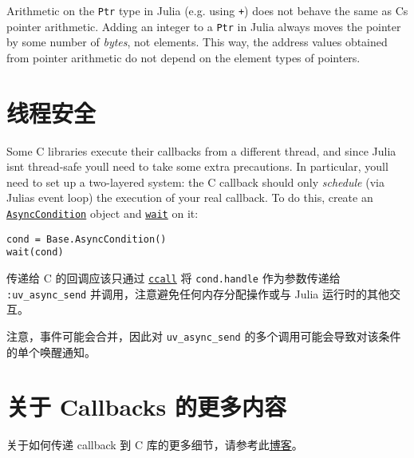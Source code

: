 Arithmetic on the \texttt{Ptr} type in Julia (e.g. using \texttt{+}) does not behave the same as C{\textquotesingle}s pointer arithmetic. Adding an integer to a \texttt{Ptr} in Julia always moves the pointer by some number of \emph{bytes}, not elements. This way, the address values obtained from pointer arithmetic do not depend on the element types of pointers.



\hypertarget{11710684987427742051}{}


\section{线程安全}



Some C libraries execute their callbacks from a different thread, and since Julia isn{\textquotesingle}t thread-safe you{\textquotesingle}ll need to take some extra precautions. In particular, you{\textquotesingle}ll need to set up a two-layered system: the C callback should only \emph{schedule} (via Julia{\textquotesingle}s event loop) the execution of your {\textquotedbl}real{\textquotedbl} callback. To do this, create an \hyperlink{6110056827764884232}{\texttt{AsyncCondition}} object and \hyperlink{13761789780433862250}{\texttt{wait}} on it:




\begin{verbatim}
cond = Base.AsyncCondition()
wait(cond)
\end{verbatim}



传递给 C 的回调应该只通过 \hyperlink{14245046751182637566}{\texttt{ccall}} 将 \texttt{cond.handle} 作为参数传递给 \texttt{:uv\_async\_send} 并调用，注意避免任何内存分配操作或与 Julia 运行时的其他交互。



注意，事件可能会合并，因此对 \texttt{uv\_async\_send} 的多个调用可能会导致对该条件的单个唤醒通知。



\hypertarget{9551685449391366384}{}


\section{关于 Callbacks 的更多内容}



关于如何传递 callback 到 C 库的更多细节，请参考此\href{https://julialang.org/blog/2013/05/callback}{博客}。



